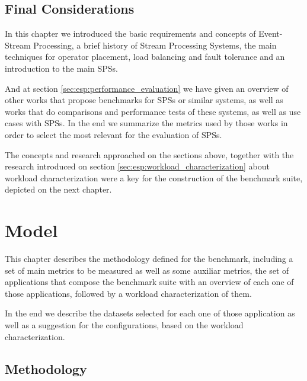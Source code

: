 \documentclass[ppgc,diss,english]{iiufrgs}
\begin{document}
\section{Final Considerations}

In this chapter we introduced the basic requirements and concepts of Event-Stream Processing, a brief history of Stream Processing Systems, the main techniques for operator placement, load balancing and fault tolerance and an introduction to the main SPSs.

And at section \ref{sec:esp:performance_evaluation} we have given an overview of other works that propose benchmarks for SPSs or similar systems, as well as works that do comparisons and performance tests of these systems, as well as use cases with SPSs. In the end we summarize the metrics used by those works in order to select the most relevant for the evaluation of SPSs.

The concepts and research approached on the sections above, together with the research introduced on section \ref{sec:esp:workload_characterization} about workload characterization were a key for the construction of the benchmark suite, depicted on the next chapter.

\chapter{Model}
\label{chapter:model}

This chapter describes the methodology defined for the benchmark, including a set of main metrics to be measured as well as some auxiliar metrics, the set of applications that compose the benchmark suite with an overview of each one of those applications, followed by a workload characterization of them.

In the end we describe the datasets selected for each one of those application as well as a suggestion for the configurations, based on the workload characterization.

\section{Methodology}
\label{sec:methodology}

%
%
%
\end{document}
